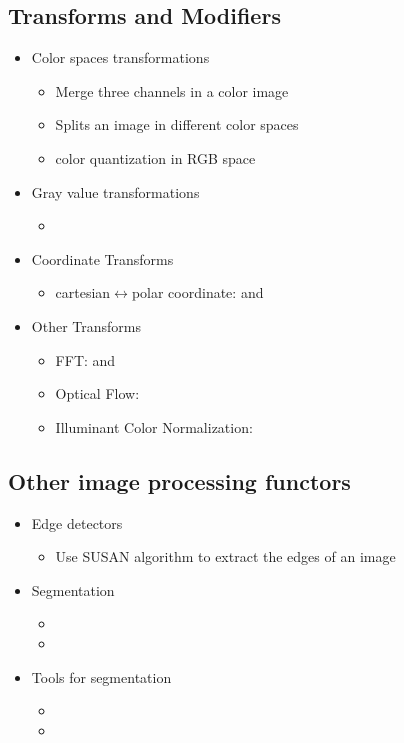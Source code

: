 \subsection{Transforms and Modifiers}\label{transform}
\begin{itemize}
\item
Color spaces transformations\begin{itemize}
\item
{} Merge three channels in a color image\item
{} Splits an image in different color spaces\item
{} color quantization in RGB space\end{itemize}
\item
Gray value transformations\begin{itemize}
\item
{}\end{itemize}
\item
Coordinate Transforms
\begin{itemize}
\item cartesian$\leftrightarrow$polar coordinate:  and 
\end{itemize}
\item
Other Transforms\begin{itemize}
\item
FFT:  and \item
Optical Flow: \item
Illuminant Color Normalization: \end{itemize}
\end{itemize}
\subsection{Other image processing functors}\label{imgproc}
\begin{itemize}
\item
Edge detectors\begin{itemize}
\item
{} Use SUSAN algorithm to extract the edges of an image\end{itemize}
\item
Segmentation\begin{itemize}
\item
{}\item
{}\end{itemize}
\item
Tools for segmentation\begin{itemize}
\item
{}\item
{}\end{itemize}
\end{itemize}
